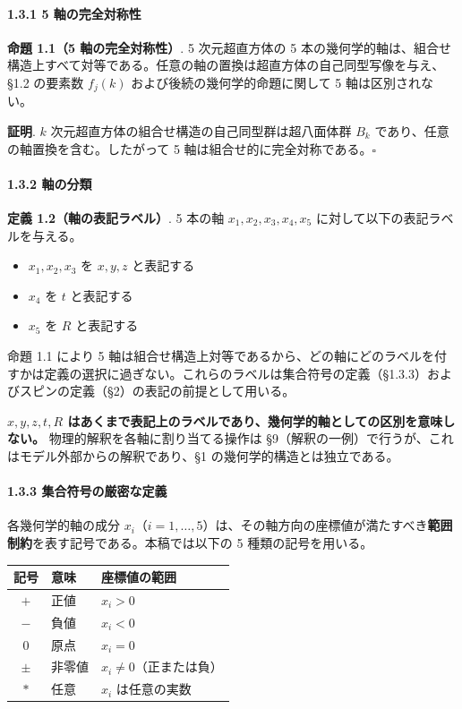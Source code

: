 \documentclass[
  a4paper,11pt]{ltjsarticle}
\newcounter{none}
\providecommand{\tightlist}{%
  \setlength{\itemsep}{0pt}\setlength{\parskip}{0pt}}
\theoremstyle{definition}
\theoremstyle{remark}
\begin{document}
\paragraph{1.3.1 5
軸の完全対称性}\label{ux8ef8ux306eux5b8cux5168ux5bfeux79f0ux6027}

\textbf{命題 1.1（5 軸の完全対称性）}. 5 次元超直方体の 5
本の幾何学的軸は、組合せ構造上すべて対等である。任意の軸の置換は超直方体の自己同型写像を与え、§1.2
の要素数 \(f_j(k)\) および後続の幾何学的命題に関して 5
軸は区別されない。

\textbf{証明}. \(k\) 次元超直方体の組合せ構造の自己同型群は超八面体群
\(B_k\) であり、任意の軸置換を含む。したがって 5
軸は組合せ的に完全対称である。\(\square\)

\paragraph{1.3.2 軸の分類}\label{ux8ef8ux306eux5206ux985e}

\textbf{定義 1.2（軸の表記ラベル）}. 5 本の軸
\(x_1, x_2, x_3, x_4, x_5\) に対して以下の表記ラベルを与える。

\begin{itemize}
\tightlist
\item
  \(x_1, x_2, x_3\) を \(x, y, z\) と表記する
\item
  \(x_4\) を \(t\) と表記する
\item
  \(x_5\) を \(R\) と表記する
\end{itemize}

命題 1.1 により 5
軸は組合せ構造上対等であるから、どの軸にどのラベルを付すかは定義の選択に過ぎない。これらのラベルは集合符号の定義（§1.3.3）およびスピンの定義（§2）の表記の前提として用いる。

\textbf{\(x, y, z, t, R\)
はあくまで表記上のラベルであり、幾何学的軸としての区別を意味しない。}
物理的解釈を各軸に割り当てる操作は
§9（解釈の一例）で行うが、これはモデル外部からの解釈であり、§1
の幾何学的構造とは独立である。

\paragraph{1.3.3
集合符号の厳密な定義}\label{ux96c6ux5408ux7b26ux53f7ux306eux53b3ux5bc6ux306aux5b9aux7fa9}

各幾何学的軸の成分
\(x_i\)（\(i = 1, \ldots, 5\)）は、その軸方向の座標値が満たすべき\textbf{範囲制約}を表す記号である。本稿では以下の
5 種類の記号を用いる。

{\def\LTcaptype{none} %
\begin{longtable}[]{@{}cll@{}}
\toprule\noalign{}
記号 & 意味 & 座標値の範囲 \\
\midrule\noalign{}
\endhead
\bottomrule\noalign{}
\endlastfoot
\(+\) & 正値 & \(x_i > 0\) \\
\(-\) & 負値 & \(x_i < 0\) \\
\(0\) & 原点 & \(x_i = 0\) \\
\(\pm\) & 非零値 & \(x_i \neq 0\)（正または負） \\
\(*\) & 任意 & \(x_i\) は任意の実数 \\
\end{longtable}
}
\end{document}

